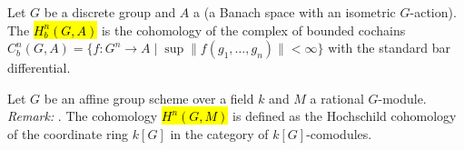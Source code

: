 \begin{definition}
Let $G$ be a discrete group and $A$ a  (a Banach space with an isometric $G$-action). The  \hl{$H^n_b(G, A)$} is the cohomology of the complex of bounded cochains $C^n_b(G, A) = \{f: G^n \to A \mid \sup \|f(g_1, \dots, g_n)\| < \infty\}$ with the standard bar differential.
\end{definition}

\begin{definition}
Let $G$ be an affine group scheme over a field $k$ and $M$ a rational $G$-module. \textit{Remark: }. The cohomology \hl{$H^n(G, M)$} is defined as the Hochschild cohomology of the coordinate ring $k[G]$ in the category of $k[G]$-comodules.
\end{definition}
